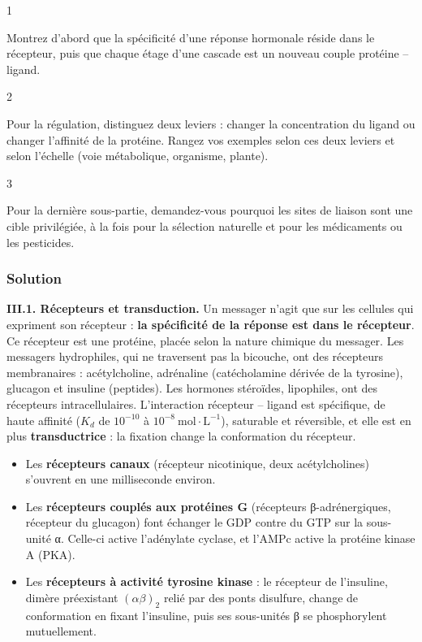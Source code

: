 \documentclass[11pt,a4paper]{article}
\providecommand{\tightlist}{\setlength{\itemsep}{0pt}\setlength{\parskip}{0pt}}
\begin{document}
\begin{indication}{1}

Montrez d'abord que la spécificité d'une réponse hormonale réside dans le récepteur, puis que chaque étage d'une cascade est un nouveau couple protéine -- ligand.

\end{indication}

\begin{indication}{2}

Pour la régulation, distinguez deux leviers : changer la concentration du ligand ou changer l'affinité de la protéine. Rangez vos exemples selon ces deux leviers et selon l'échelle (voie métabolique, organisme, plante).

\end{indication}

\begin{indication}{3}

Pour la dernière sous-partie, demandez-vous pourquoi les sites de liaison sont une cible privilégiée, à la fois pour la sélection naturelle et pour les médicaments ou les pesticides.

\end{indication}

\hypertarget{solution-6}{%
\subsubsection{Solution}\label{solution-6}}

\textbf{III.1. Récepteurs et transduction.} Un messager n'agit que sur les cellules qui expriment son récepteur : \textbf{la spécificité de la réponse est dans le récepteur}. Ce récepteur est une protéine, placée selon la nature chimique du messager. Les messagers hydrophiles, qui ne traversent pas la bicouche, ont des récepteurs membranaires : acétylcholine, adrénaline (catécholamine dérivée de la tyrosine), glucagon et insuline (peptides). Les hormones stéroïdes, lipophiles, ont des récepteurs intracellulaires. L'interaction récepteur -- ligand est spécifique, de haute affinité (\(K_d\) de \(10^{-10}\) à \(10^{-8}\ \mathrm{mol\cdot L^{-1}}\)), saturable et réversible, et elle est en plus \textbf{transductrice} : la fixation change la conformation du récepteur.

\begin{itemize}
\tightlist
\item
  Les \textbf{récepteurs canaux} (récepteur nicotinique, deux acétylcholines) s'ouvrent en une milliseconde environ.
\item
  Les \textbf{récepteurs couplés aux protéines G} (récepteurs β-adrénergiques, récepteur du glucagon) font échanger le GDP contre du GTP sur la sous-unité α. Celle-ci active l'adénylate cyclase, et l'AMPc active la protéine kinase A (PKA).
\item
  Les \textbf{récepteurs à activité tyrosine kinase} : le récepteur de l'insuline, dimère préexistant \((\alpha\beta)_2\) relié par des ponts disulfure, change de conformation en fixant l'insuline, puis ses sous-unités β se phosphorylent mutuellement.
\end{itemize}
\end{document}

